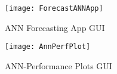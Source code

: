 
\begin{figure}[H]
\centering
\texttt{[image: ForecastANNApp]}
\caption{ANN Forecasting App GUI}
\label{figApp4_1} %
\end{figure}

\begin{figure}[H]
\centering
\texttt{[image: AnnPerfPlot]}
\caption{ANN-Performance Plots GUI}
\label{figApp4_2} %
\end{figure}